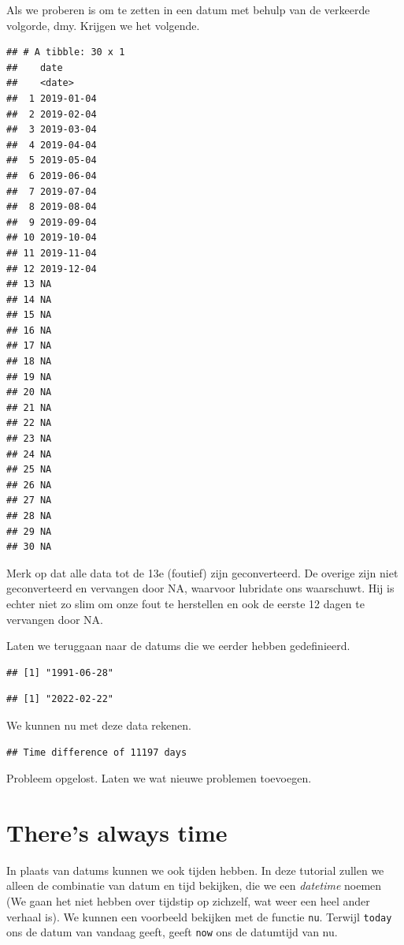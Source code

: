 \documentclass[]{tufte-book}
\begin{document}
Als we proberen is om te zetten in een datum met behulp van de verkeerde volgorde, dmy. Krijgen we het volgende.

\begin{verbatim}
## # A tibble: 30 x 1
##    date      
##    <date>    
##  1 2019-01-04
##  2 2019-02-04
##  3 2019-03-04
##  4 2019-04-04
##  5 2019-05-04
##  6 2019-06-04
##  7 2019-07-04
##  8 2019-08-04
##  9 2019-09-04
## 10 2019-10-04
## 11 2019-11-04
## 12 2019-12-04
## 13 NA        
## 14 NA        
## 15 NA        
## 16 NA        
## 17 NA        
## 18 NA        
## 19 NA        
## 20 NA        
## 21 NA        
## 22 NA        
## 23 NA        
## 24 NA        
## 25 NA        
## 26 NA        
## 27 NA        
## 28 NA        
## 29 NA        
## 30 NA
\end{verbatim}

Merk op dat alle data tot de 13e (foutief) zijn geconverteerd. De overige zijn niet geconverteerd en vervangen door NA, waarvoor lubridate ons waarschuwt. Hij is echter niet zo slim om onze fout te herstellen en ook de eerste 12 dagen te vervangen door NA.

Laten we teruggaan naar de datums die we eerder hebben gedefinieerd.

\begin{verbatim}
## [1] "1991-06-28"
\end{verbatim}

\begin{verbatim}
## [1] "2022-02-22"
\end{verbatim}

We kunnen nu met deze data rekenen.

\begin{verbatim}
## Time difference of 11197 days
\end{verbatim}

Probleem opgelost. Laten we wat nieuwe problemen toevoegen.

\hypertarget{theres-always-time}{%
\section{There's always time}\label{theres-always-time}}

In plaats van datums kunnen we ook tijden hebben. In deze tutorial zullen we alleen de combinatie van datum en tijd bekijken, die we een \emph{datetime} noemen (We gaan het niet hebben over tijdstip op zichzelf, wat weer een heel ander verhaal is). We kunnen een voorbeeld bekijken met de functie \texttt{nu}. Terwijl \texttt{today} ons de datum van vandaag geeft, geeft \texttt{now} ons de datumtijd van nu.
\end{document}
